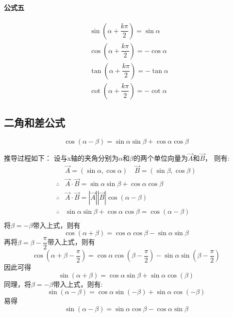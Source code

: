 \documentclass[a4paper, 12pt, draft]{article}
\begin{document}
    \paragraph{公式五}
    \begin{equation}
        \begin{aligned}
            &\sin{(\alpha + \dfrac{k\pi}{2})} = \sin{\alpha} \\
            &\cos{(\alpha + \dfrac{k\pi}{2})} = -\cos{\alpha} \\
            &\tan{(\alpha + \dfrac{k\pi}{2})} = -\tan{\alpha} \\
            &\cot{(\alpha + \dfrac{k\pi}{2})} = -\cot{\alpha}
        \end{aligned}
    \end{equation}


    \subsection{二角和差公式}
    \begin{equation}\label{二角和差公式}
        \cos{(\alpha - \beta)} = \sin{\alpha}\sin{\beta} + \cos{\alpha}\cos{\beta}
    \end{equation}

    推导过程如下：
    设与x轴的夹角分别为$\alpha$和$\beta$的两个单位向量为$\vec{A}$和$\vec{B}$，
    则有:
    $$
    \begin{aligned}
        &\vec{A} = (\sin{\alpha}, \cos{\alpha}) \quad \vec{B} = (\sin{\beta}, \cos{\beta})     \\
        \therefore &\vec{A} \cdot \vec{B} = \sin{\alpha}\sin{\beta} + \cos{\alpha}\cos{\beta}  \\
        \therefore &\vec{A} \cdot \vec{B} = |\vec{A}||\vec{B}|\cos{(\alpha - \beta)}           \\
        \therefore &\sin{\alpha}\sin{\beta} + \cos{\alpha}\cos{\beta} = \cos{(\alpha - \beta)} \\
    \end{aligned}
    $$
    将$\beta = -\beta$带入上式，则有
    \begin{equation}\label{2.3}
        \cos{(\alpha + \beta)} = \cos{\alpha}\cos{\beta} - \sin{\alpha}\sin{\beta}
    \end{equation}
    再将$\beta = \beta - \dfrac{\pi}{2}$带入上式，则有
    $$
    \cos{(\alpha + \beta - \dfrac{\pi}{2})} = \cos{\alpha}\cos{(\beta - \dfrac{\pi}{2})} - \sin{\alpha}\sin{(\beta - \dfrac{\pi}{2})}
    $$
    因此可得
    \begin{equation}\label{2.4}
        \sin{(\alpha + \beta)} = \cos{\alpha}\sin{\beta} + \sin{\alpha}\cos(\beta)
    \end{equation}
    同理，将$\beta = -\beta$带入上式，则有:
    $$
    \sin{(\alpha - \beta)} = \cos{\alpha}\sin{(-\beta)}+\sin{\alpha}\cos{(-\beta)}
    $$
    易得
    \begin{equation}\label{2.5}
        \sin{(\alpha - \beta)} = \sin{\alpha}\cos{\beta} - \cos{\alpha}\sin{\beta}
    \end{equation}
    
\end{document}

